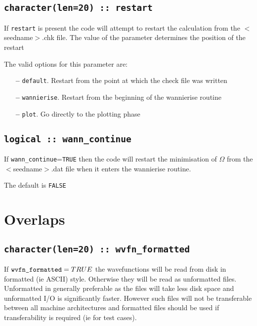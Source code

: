 \subsection[restart]{\tt character(len=20) :: restart}

If \verb#restart# is present the code will attempt to restart the calculation
from the $<$seedname$>$.chk file. The value of the parameter
determines the position of the restart

The valid options for this parameter are:
\begin{itemize}
\item[{\bf --}]  \verb#default#. Restart from the point at which the
  check file was written  
\item[{\bf --}]  \verb#wannierise#. Restart from the beginning of the
  wannierise routine 
\item[{\bf --}]  \verb#plot#. Go directly to the plotting phase 


\end{itemize}

\subsection[wann\_continue]{\tt logical :: wann\_continue}

If \verb#wann_continue#=\verb#TRUE# then the code will restart the minimisation
of $\Omega$ from the $<$seedname$>$.dat file when it enters the wannierise routine.

The default is \verb#FALSE#  



\section{Overlaps}



\subsection[wvfn\_formated]{\tt character(len=20) :: wvfn\_formatted}

If $\verb#wvfn_formatted#=TRUE$ the wavefunctions will be read from disk
in formatted (ie ASCII) style. Otherwise they will be read as unformatted
files. Unformatted in generally preferable as the files will take less disk
space and unformatted I/O is significantly faster. However such files
will not be transferable between all machine architectures and formatted
files should be used if transferability is required (ie for test cases).

